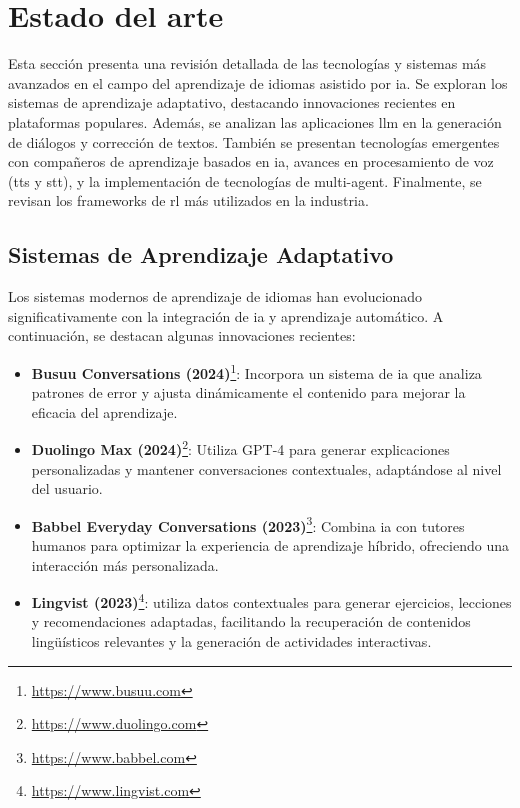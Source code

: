 \chapter{Estado del arte}
\label{estado-del-arte}

Esta sección presenta una revisión detallada de las tecnologías y sistemas más avanzados en el campo del aprendizaje de idiomas asistido por \gls{ia}. Se exploran los sistemas de aprendizaje adaptativo, destacando innovaciones recientes en plataformas populares. Además, se analizan las aplicaciones \gls{llm} en la generación de diálogos y corrección de textos. También se presentan tecnologías emergentes con compañeros de aprendizaje basados en \gls{ia}, avances en procesamiento de voz (\gls{tts} y \gls{stt}), y la implementación de tecnologías de \gls{multi-agent}. Finalmente, se revisan los frameworks de \gls{rl} más utilizados en la industria.

\section{Sistemas de Aprendizaje Adaptativo}

Los sistemas modernos de aprendizaje de idiomas han evolucionado significativamente con la integración de \gls{ia} y aprendizaje automático. A continuación, se destacan algunas innovaciones recientes:

\begin{itemize}
  \item \textbf{Busuu Conversations (2024)}\footnote{\url{https://www.busuu.com}}: Incorpora un sistema de \gls{ia} que analiza patrones de error y ajusta dinámicamente el contenido para mejorar la eficacia del aprendizaje.
  \item \textbf{Duolingo Max (2024)}\footnote{\url{https://www.duolingo.com}}: Utiliza GPT-4 para generar explicaciones personalizadas y mantener conversaciones contextuales, adaptándose al nivel del usuario.
  \item \textbf{Babbel Everyday Conversations (2023)}\footnote{\url{https://www.babbel.com}}: Combina \gls{ia} con tutores humanos para optimizar la experiencia de aprendizaje híbrido, ofreciendo una interacción más personalizada.
  \item \textbf{Lingvist (2023)}\footnote{\url{https://www.lingvist.com}}: utiliza datos contextuales para generar ejercicios, lecciones y recomendaciones adaptadas, facilitando la recuperación de contenidos lingüísticos relevantes y la generación de actividades interactivas.
\end{itemize}

